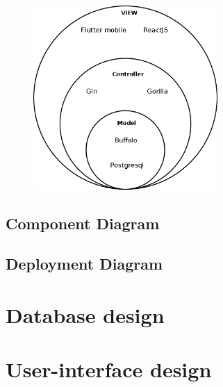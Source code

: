 		\begin{figure}
		\begin{center}

		\includegraphics[width=7cm]{Diagram/MVC.png}

		\end{center}
		\end{figure}





	\subsection{Component Diagram}

	\subsection{Deployment Diagram}

\section{Database design}

\section{User-interface design}